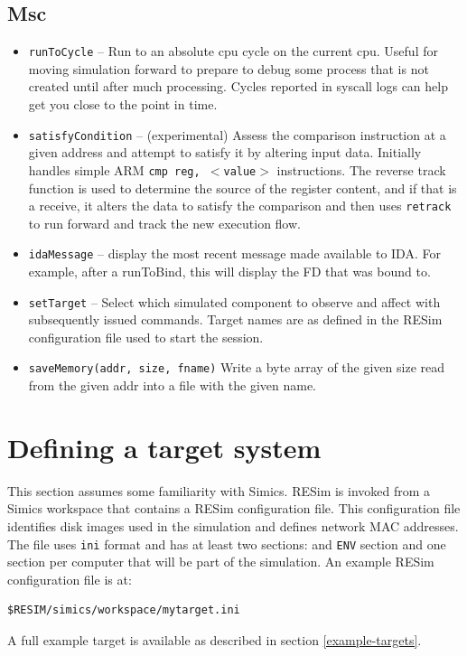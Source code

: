 \documentclass[titlepage]{article}
\begin{document}
\subsection{Msc}
\begin{itemize}
\item{\tt runToCycle} -- Run to an absolute cpu cycle on the current cpu.  Useful for moving simulation forward to prepare to debug some process
that is not created until after much processing.  Cycles reported in syscall logs can help get you close to the point in time.

\item{\tt satisfyCondition} -- (experimental) Assess the comparison instruction at a given address and attempt to satisfy it by altering input data.  
Initially handles simple ARM {\tt cmp reg, $<$value$>$} instructions.  The 
reverse track function is used to determine the source of the register content, and if that is a receive, it alters the data to satisfy the
comparison and then uses {\tt retrack} to run forward and track the new execution flow.

\item{\tt idaMessage} -- display the most recent message made available to IDA.  For example, after a runToBind, this will display the FD that was bound to.
\item {\tt setTarget} -- Select which simulated component to observe and affect with subsequently issued commands.  Target names are as defined in the
RESim configuration file used to start the session.

\item {\tt saveMemory(addr, size, fname)} Write a byte array of the given size read from the given addr into a file with the given name.

\end{itemize}

\section{Defining a target system}
\label{configuration}
This section assumes some familiarity with Simics.  RESim is invoked from a Simics workspace that contains a RESim configuration file.
This configuration file identifies disk images used in the simulation and defines network MAC addresses.  
The file uses {\tt ini} format and has at least two sections: and {\tt ENV} section and one section per computer that will be part
of the simulation.  An example RESim configuration file is at:
\begin{verbatim}
$RESIM/simics/workspace/mytarget.ini
\end{verbatim}
A full example target is available as described in section \ref{example-targets}.
\end{document}
